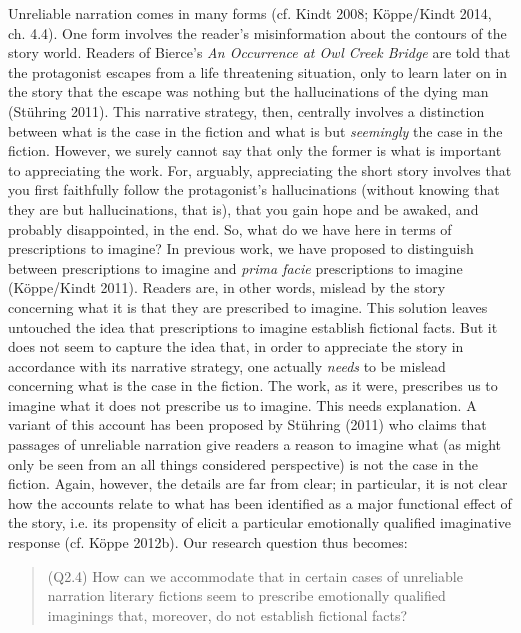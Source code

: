 Unreliable narration comes in many forms (cf. Kindt 2008; K\"oppe/Kindt 2014, ch. 4.4). One form involves the reader's misinformation about the contours of the story world. Readers of Bierce's \emph{An Occurrence at Owl Creek Bridge} are told that the protagonist escapes from a life threatening situation, only to learn later on in the story that the escape was nothing but the hallucinations of the dying man (St\"uhring 2011). This narrative strategy, then, centrally involves a distinction between what is the case in the fiction and what is but \emph{seemingly} the case in the fiction. However, we surely cannot say that only the former is what is important to appreciating the work. For, arguably, appreciating the short story involves that you first faithfully follow the protagonist's hallucinations (without knowing that they are but hallucinations, that is), that you gain hope and be awaked, and probably disappointed, in the end. So, what do we have here in terms of prescriptions to imagine? In previous work, we have proposed to distinguish between prescriptions to imagine and \emph{prima facie} prescriptions to imagine (K\"oppe/Kindt 2011). Readers are, in other words, mislead by the story concerning what it is that they are prescribed to imagine. This solution leaves untouched the idea that prescriptions to imagine establish fictional facts. But it does not seem to capture the idea that, in order to appreciate the story in accordance with its narrative strategy, one actually \emph{needs} to be mislead concerning what is the case in the fiction. The work, as it were, prescribes us to imagine what it does not prescribe us to imagine. This needs explanation. A variant of this account has been proposed by St\"uhring (2011) who claims that passages of unreliable narration give readers a reason to imagine what (as might only be seen from an all things considered perspective) is not the case in the fiction. Again, however, the details are far from clear; in particular, it is not clear how the accounts relate to what has been identified as a major functional effect of the story, i.e. its propensity of elicit a particular emotionally qualified imaginative response (cf. K\"oppe 2012b). Our research question thus becomes:

\vspace{-.2cm}
\begin{quote}
(Q2.4)  How can we accommodate that in certain cases of unreliable narration literary fictions seem  to prescribe emotionally qualified imaginings that, moreover, do not establish fictional facts?
\end{quote}
\vspace{-.2cm}

